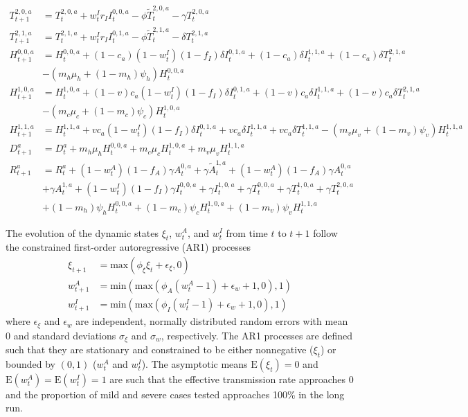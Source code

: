 \documentclass{article}
\begin{document}
{\begin{align}
T^{2,0,a}_{t+1} &= T^{2,0,a}_t + w^I_t r_I I^{0,0,a}_t - \phi \tilde{T}^{2,0,a}_t  - \gamma T^{2,0,a}_t \label{eqn:tsev} \\
T^{2,1,a}_{t+1} &= T^{2,1,a}_t + w^I_t r_I I^{0,1,a}_t - \phi \tilde{T}^{2,1,a}_t  - \delta T^{2,1,a}_t \label{eqn:tsevhosp} \\
H^{0,0,a}_{t+1} &= H^{0,0,a}_t + (1-c_a)(1-w^I_t)(1-f_I)\delta I^{0,1,a}_t + (1-c_a)\delta I^{1,1,a}_t + (1-c_a)\delta T^{2,1,a}_t \label{eqn:hosp} \\
& - \left(m_h\mu_h + (1-m_h)\psi_h\right) H^{0,0,a}_t \nonumber \\
H^{1,0,a}_{t+1} &= H^{1,0,a}_t + (1-v)c_a(1-w^I_t)(1-f_I)\delta I^{0,1,a}_t + (1-v)c_a\delta I^{1,1,a}_t + (1-v)c_a\delta T^{2,1,a}_t \label{eqn:icu} \\
& - \left(m_c\mu_c + (1-m_c)\psi_c\right) H^{1,0,a}_t \nonumber \\
H^{1,1,a}_{t+1} &= H^{1,1,a}_t + v c_a(1-w^I_t)(1-f_I)\delta I^{0,1,a}_t + v c_a\delta I^{1,1,a}_t + v c_a\delta T^{1,1,a}_t - \left(m_v\mu_v + (1-m_v)\psi_v\right) H^{1,1,a}_t \label{eqn:vent} \\
D^a_{t+1} &= D^a_t + m_h\mu_h H^{0,0,a}_t + m_c\mu_c H^{1,0,a}_t + m_v\mu_v H^{1,1,a}_t \label{eqn:died} \\
R^a_{t+1} &= R^a_t + (1-w^A_t)(1 - f_A)\gamma A^{0,a}_t + \gamma\tilde{A}^{1,a}_t + (1-w^A_t)(1 - f_A)\gamma A^{0,a}_t \label{eqn:rec} \\
 & + \gamma A^{1,a}_t + (1-w^I_t)(1-f_I)\gamma I^{0,0,a}_t + \gamma I^{1,0,a}_t + \gamma T^{0,0,a}_t + \gamma T^{1,0,a}_t + \gamma T^{2,0,a}_t \nonumber \\
 & + (1-m_h)\psi_h H^{0,0,a}_t + (1-m_c)\psi_c H^{1,0,a}_t + (1-m_v)\psi_v H^{1,1,a}_t \nonumber
\end{align}}

The evolution of the dynamic states $\xi_t$, $w^A_t$, and $w^I_t$ from time $t$ to $t+1$ follow the constrained first-order autoregressive (AR1) processes
\begin{align}
\xi_{t+1} &= \mbox{max}(\phi_\xi \xi_t + \epsilon_\xi, 0) \label{eqn:xi} \\
w^A_{t+1} &= \mbox{min}\left(\mbox{max}(\phi_A (w^A_t - 1) + \epsilon_w + 1, 0), 1\right) \label{eqn:testmild} \\
w^I_{t+1} &= \mbox{min}\left(\mbox{max}(\phi_I (w^I_t - 1) + \epsilon_w + 1, 0), 1\right) \label{eqn:testsev}
\end{align}
where $\epsilon_\xi$ and $\epsilon_w$ are independent, normally distributed random errors with mean 0 and standard deviations $\sigma_\xi$ and $\sigma_w$, respectively. The AR1 processes are defined such that they are stationary and constrained to be either nonnegative ($\xi_t$) or bounded by $(0,1)$ ($w^A_t$ and $w^I_t$). The asymptotic means $\mbox{E}(\xi_t) = 0$ and $\mbox{E}(w^A_t) = \mbox{E}(w^I_t) = 1$ are such that the effective transmission rate approaches 0 and the proportion of mild and severe cases tested approaches 100\% in the long run.
\end{document}
